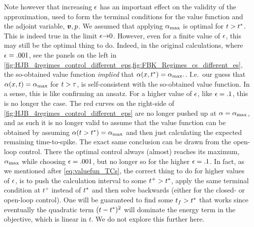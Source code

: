 \documentclass{article}
\begin{document}
Note however that increasing ${\epsilon}$ has an important effect on the validity of
the approximation, used to form the terminal conditions for
the value function and the adjoint variable, ${ \boldsymbol{v} },p$. We assumed that applying
${ {\alpha}_{\textrm{max}} }$ is optimal for $t>{ t^* }$. This is indeed true in the
limit ${\epsilon} {\rightarrow} 0$. However, even for a finite value of ${\epsilon}$, this may still
be the optimal thing to do. Indeed, in the original calculations,
where ${\epsilon}=.001$, see the panels on the left in
\cref{fig:HJB_4regimes_control_different_eps,fig:FBK_Regimes_cs_different_es},
the so-obtained value function {\sl implied} that ${\alpha}(x,{ t^* }) = { {\alpha}_{\textrm{max}} }.$. I.e.\ our
guess that ${\alpha}(x, t) = { {\alpha}_{\textrm{max}} }$ for $t > {\tau}$, is self-consistent with the
so-obtained value function. In a sense, this is like confirming an ansatz. For a higher
value of ${\epsilon}$, like ${\epsilon} = .1$, this is no longer the case. The red
curves on the right-side of \cref{fig:HJB_4regimes_control_different_eps} are no
longer pushed up at ${\alpha} = { {\alpha}_{\textrm{max}} }$, and as such it is no longer valid to
assume that the value function can be obtained by assuming ${\alpha}(t>{ t^* }) = { {\alpha}_{\textrm{max}} }$
and then just calculating the expected remaining time-to-spike.
The exact same conclusion can be drawn from the open-loop control. There the
optimal control always (almost) reaches its maximum, ${ {\alpha}_{\textrm{max}} }$ while choosing
${\epsilon} = .001$, but no longer so for the higher ${\epsilon} = .1$.
In fact, as we mentioned after \cref{eq:valuefun_TCs}, the correct thing to do
for higher values of ${\epsilon}$, is to push the
calculation interval to some $t^+ > { t^* }$, apply the same terminal condition at
$t^+$ instead of ${ t^* }$ and then solve backwards (either for the closed- or
open-loop control). One will be guaranteed to find some $t_f > { t^* }$ that works
since eventually the quadratic term $(t-{ t^* })^2$ will dominate the energy term in
the objective, which is linear in $t$. We do not explore this further here. 
\end{document}
